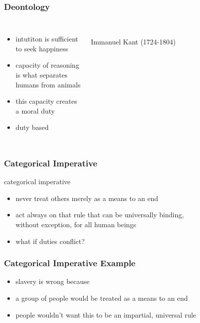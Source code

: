 \documentclass[dvipsnames]{beamer}
\theoremstyle{plain}
\begin{document}
\begin{frame}
  \frametitle{Deontology}

  \begin{columns}
    \begin{itemize}
      \item intutiton is sufficient\\
        to seek happiness
      \item capacity of reasoning\\
        is what separates\\
        humans from animals
      \item this capacity creates\\
        a moral duty

      \medskip
      \item duty based
    \end{itemize}

    \begin{center}
      \\
      Immanuel Kant (1724-1804)
    \end{center}
  \end{columns}
\end{frame}

\begin{frame}
  \frametitle{Categorical Imperative}

  \begin{block}{categorical imperative}
    \begin{itemize}
      \item never treat others merely as a means to an end
      \item act always on that rule that can be universally binding,\\
        without exception, for all human beings
    \end{itemize}
  \end{block}

  \pause
  \begin{itemize}
    \item what if duties conflict?
  \end{itemize}
\end{frame}

\begin{frame}
  \frametitle{Categorical Imperative Example}

  \begin{itemize}
    \item slavery is wrong because

    \medskip
    \item a group of people would be treated as a means to an end
    \item people wouldn't want this to be an impartial, universal rule
  \end{itemize}
\end{frame}
\end{document}
